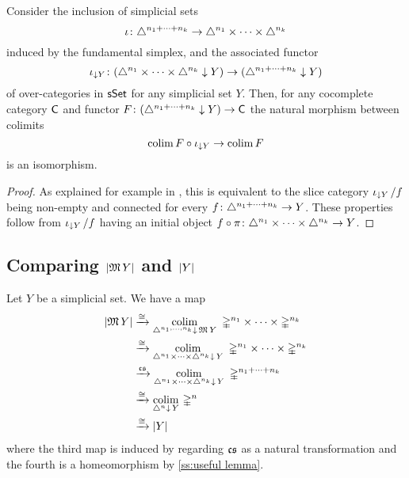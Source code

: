 Consider the inclusion of simplicial sets
\[
\operatorname{\iota} \colon
\triangle^{n_1+\dots+n_k} \to
\triangle^{n_1} \times \dots \times \triangle^{n_k}
\]
induced by the fundamental simplex, and the associated functor
\[
\operatorname{\iota}_{\downarrow Y} \colon (\triangle^{n_1} \times \dots \times \triangle^{n_k} \downarrow Y) \to (\triangle^{n_1+\dots+n_k} \downarrow Y)
\]
of over-categories in $\mathsf{sSet}$ for any simplicial set $Y$.
Then, for any cocomplete category $\mathsf{C}$ and functor $F \colon (\triangle^{n_1+\dots+n_k} \downarrow Y) \to \mathsf{C}$ the natural morphism between colimits
\[
\operatorname*{colim} F \circ \operatorname{\iota}_{\downarrow Y} \to \operatorname*{colim} F
\]
is an isomorphism.

\begin{proof}
	As explained for example in \cite[]{riehl2014categorical}, this is equivalent to the slice category $\operatorname{\iota}_{\downarrow Y} / f$ being non-empty and connected for every $f \colon \triangle^{n_1+\dots+n_k} \to Y$.
	These properties follow from $\operatorname{\iota}_{\downarrow Y} / f$ having an initial object $f \circ \operatorname{\pi} \colon \triangle^{n_1} \times \dots \times \triangle^{n_k} \to Y$.
\end{proof}



\subsection{Comparing $\lvert\operatorname{\mathfrak{M}} Y\rvert$ and $\lvert Y\rvert$}

Let $Y$ be a simplicial set.
We have a map
\[
\begin{split}
\lvert\operatorname{\mathfrak{M}} Y\rvert & \xrightarrow{\cong}
\operatorname*{colim}_{\triangle^{n_1, \dots, n_k} \downarrow \, \operatorname{\mathfrak{M}} Y} \
\mathbb{\Delta}^{n_1} \times \cdots \times \mathbb{\Delta}^{n_k} \\ & \xrightarrow{\cong}
\operatorname*{colim}_{\triangle^{n_1} \times \dots \times \triangle^{n_k} \downarrow \, Y} \
\mathbb{\Delta}^{n_1} \times \cdots \times \mathbb{\Delta}^{n_k} \\ & \xrightarrow{\operatorname{\mathfrak{cs}}}
\operatorname*{colim}_{\triangle^{n_1} \times \dots \times \triangle^{n_k} \downarrow \, Y} \
\mathbb{\Delta}^{n_1 + \dots + n_k} \\ & \xrightarrow{\cong}
\operatorname*{colim}_{\triangle^{n} \downarrow \, Y} \,
\mathbb{\Delta}^{n} \\ & \xrightarrow{\cong}
\lvert Y\rvert
\end{split}
\]
where the third map is induced by regarding $\operatorname{\mathfrak{cs}}$ as a natural transformation and the fourth is a homeomorphism by \cref{ss:useful lemma}.

